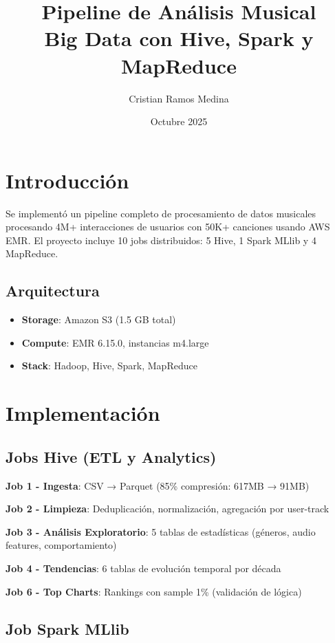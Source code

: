 \documentclass[11pt,a4paper]{article}
\title{\textbf{Pipeline de Análisis Musical} \\ \large{Big Data con Hive, Spark y MapReduce}}
\author{Cristian Ramos Medina}
\date{Octubre 2025}
\begin{document}
\maketitle

\section{Introducción}
Se implementó un pipeline completo de procesamiento de datos musicales procesando 4M+ interacciones de usuarios con 50K+ canciones usando AWS EMR. El proyecto incluye 10 jobs distribuidos: 5 Hive, 1 Spark MLlib y 4 MapReduce.

\subsection{Arquitectura}
\begin{itemize}
    \item \textbf{Storage}: Amazon S3 (1.5 GB total)
    \item \textbf{Compute}: EMR 6.15.0, instancias m4.large
    \item \textbf{Stack}: Hadoop, Hive, Spark, MapReduce
\end{itemize}

\section{Implementación}

\subsection{Jobs Hive (ETL y Analytics)}

\textbf{Job 1 - Ingesta}: CSV → Parquet (85\% compresión: 617MB → 91MB)

\textbf{Job 2 - Limpieza}: Deduplicación, normalización, agregación por user-track

\textbf{Job 3 - Análisis Exploratorio}: 5 tablas de estadísticas (géneros, audio features, comportamiento)

\textbf{Job 4 - Tendencias}: 6 tablas de evolución temporal por década

\textbf{Job 6 - Top Charts}: Rankings con sample 1\% (validación de lógica)

\subsection{Job Spark MLlib}
\end{document}
